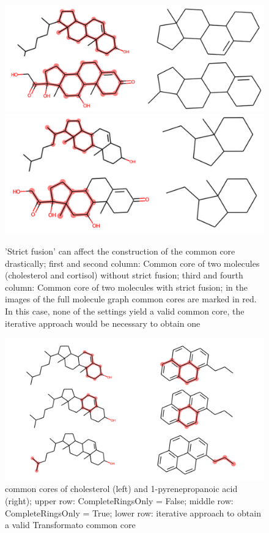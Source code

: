 \begin{figure}
\includegraphics[scale=0.4]{sterols_wo_strictfusion}\includegraphics[scale=0.4]{sterols_w_strictfusion}

\caption{'Strict fusion' can affect the construction of the common core drastically; first and second column: Common core of two molecules (cholesterol
and cortisol) without strict fusion; third and fourth column: Common
core of two molecules with strict fusion; in the images of the full molecule graph common cores are marked in red. In this case, none of the settings yield a valid common core, the iterative approach would be necessary to obtain one }

\end{figure}




\begin{figure}
	\includegraphics[scale=0.6]{cholesterol_pryenepropanoic_acid.png}
	
	\caption{common cores of cholesterol (left) and 1-pyrenepropanoic acid (right); upper row: CompleteRingsOnly = False; middle row: CompleteRingsOnly = True; lower row: iterative approach to obtain a valid Transformato common core}
	\label{fig:pyrene}
\end{figure}

